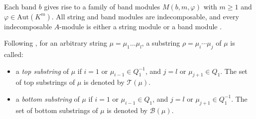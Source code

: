 \documentclass[a4paper,10pt]{amsart}
\theoremstyle{plain}          %
\theoremstyle{definition}
\newcommand{\Aut}{\mathrm{Aut}}
\begin{document}
Each band $b$ gives rise to a family of band modules $M(b,m,\varphi)$ with $m\geq 1$ and $\varphi\in\Aut (K^m)$. All string and band modules are indecomposable, and every
indecomposable $A$-module is either a string module or a band module \cite{BR97}.

Following \cite{PPP}, for an arbitrary string $\mu=\mu_1\dots \mu_l$, 
a substring $\rho = \mu_i \cdots \mu_j$ of $\mu$ is called:
\begin{itemize}
    \item a \textit{top substring} of $\mu$ if $i = 1$ or $\mu_{i-1} \in Q_1^{-1}$, and $j = l$ or $\mu_{j+1} \in Q_1$. 
    The set of top substrings of $\mu$ is denoted by $\mathcal{T}(\mu)$.
    
    \item a \textit{bottom substring} of $\mu$ if $i = 1$ or $\mu_{i-1} \in Q_1$, and $j = l$ or $\mu_{j+1} \in Q_1^{-1}$. 
    The set of bottom substrings of $\mu$ is denoted by $\mathcal{B}(\mu)$.
\end{itemize}







    
        
\end{document}
